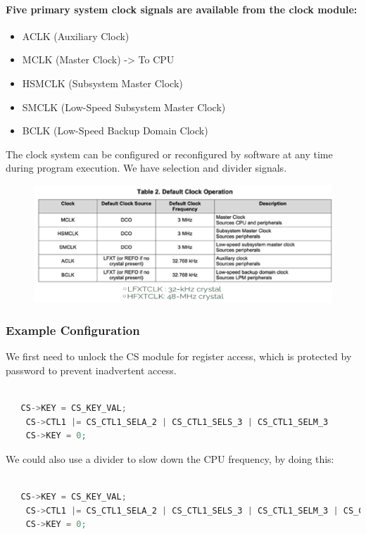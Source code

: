 \paragraph{Five primary system clock signals are available from the clock module:}

\begin{itemize}
    \item[] ACLK (Auxiliary Clock)
    \item[] MCLK (Master Clock) -> To CPU
    \item[] HSMCLK (Subsystem Master Clock)
    \item[] SMCLK (Low-Speed Subsystem Master Clock)
    \item[] BCLK (Low-Speed Backup Domain Clock)
\end{itemize}

The clock system can be configured or reconfigured by software at any time during program execution.
We have selection and divider signals.


\begin{figure}[H]
    \centering
    \includegraphics[width=0.75\linewidth]{img/image80.png}
\end{figure}

\subsubsection{Example Configuration}

We first need to unlock the CS module for register access, which is protected by password to prevent
inadvertent access.

\begin{lstlisting}[language=c++]

   CS->KEY = CS_KEY_VAL;
    CS->CTL1 |= CS_CTL1_SELA_2 | CS_CTL1_SELS_3 | CS_CTL1_SELM_3
    CS->KEY = 0;
\end{lstlisting}


We could also use a divider to slow down the CPU frequency, by doing this:

\begin{lstlisting}[language=c++]

   CS->KEY = CS_KEY_VAL;
    CS->CTL1 |= CS_CTL1_SELA_2 | CS_CTL1_SELS_3 | CS_CTL1_SELM_3 | CS_CTL1_DIVM_7
    CS->KEY = 0;
\end{lstlisting}


